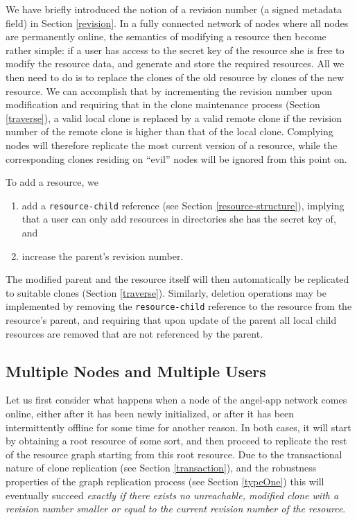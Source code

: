\documentclass[11pt]{article}
\begin{document}
\begin{mainmatter}
We have briefly introduced the notion of a revision number (a signed metadata field) in Section \ref{revision}. In a fully connected network of nodes where all nodes are permanently online, the semantics of modifying a resource then become rather simple: if a user has access to the secret key of the resource she is free to modify the resource data, and generate and store the required resources. All we then need to do is to replace the clones of the old resource by clones of the new resource. We can accomplish that by incrementing the revision number upon modification and requiring that in the clone maintenance process (Section \ref{traverse}), a valid local clone is replaced by a valid remote clone if the revision number of the remote clone is higher than that of the local clone. Complying nodes will therefore replicate the most current version of a resource, while the corresponding clones residing on ``evil'' nodes will be ignored from this point on.

To add a resource, we 
\begin{enumerate}
\item add a  \texttt{resource-child} reference (see Section \ref{resource-structure}), implying that a user can only add resources in directories she has the secret key of, and 
\item increase the parent's revision number.
\end{enumerate}
The modified parent and the resource itself will then automatically be replicated to suitable clones (Section \ref{traverse}). Similarly, deletion operations may be implemented by removing the \texttt{resource-child}  reference to the resource from the resource's parent, and requiring that upon update of the parent all local child resources are removed that are not referenced by the parent.

\subsection{Multiple Nodes and Multiple Users}
\label{multiple}
Let us first consider what happens when a node of the angel-app network comes online, either after it has been newly initialized, or after it has been intermittently offline for some time for another reason. In both cases, it will start by obtaining a root resource of some sort, and then proceed to replicate the rest of the resource graph starting from this root resource. Due to the transactional nature of clone replication (see Section \ref{transaction}), and the robustness properties of the graph replication process (see Section \ref{typeOne}) this will eventually succeed \emph{exactly if there exists no unreachable, modified clone  with a revision number smaller or equal to the current revision number of the resource}.


\end{mainmatter}
\end{document}
